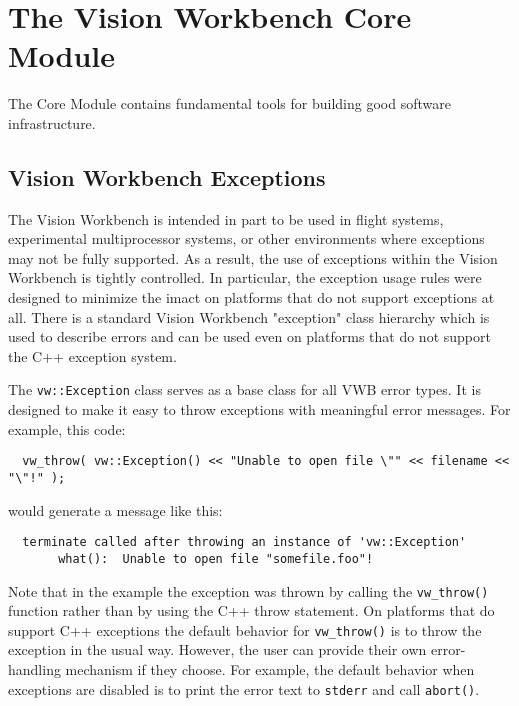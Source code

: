\chapter{The Vision Workbench Core Module}
\label{ch:core-module}

The Core Module contains fundamental tools for building good software infrastructure.

 \section{Vision Workbench Exceptions}
\label{sec:exceptions}

The Vision Workbench is intended in part to be used in flight systems,
experimental multiprocessor systems, or other environments where
exceptions may not be fully supported.  As a result, the use of
exceptions within the Vision Workbench is tightly controlled.  In
particular, the exception usage rules were designed to minimize the
imact on platforms that do not support exceptions at all.  There is a
standard Vision Workbench "exception" class hierarchy which is used to
describe errors and can be used even on platforms that do not support
the C++ exception system.
 
The \verb#vw::Exception# class serves as a base class for all VWB error
types.  It is designed to make it easy to throw exceptions with
meaningful error messages.  For example, this code:

\begin{verbatim}
  vw_throw( vw::Exception() << "Unable to open file \"" << filename << "\"!" );
\end{verbatim}

would generate a message like this:

\begin{verbatim}
  terminate called after throwing an instance of 'vw::Exception'
       what():  Unable to open file "somefile.foo"! 
\end{verbatim}

Note that in the example the exception was thrown by calling the
\verb#vw_throw()# function rather than by using the C++ throw
statement.  On platforms that do support C++ exceptions the default
behavior for \verb#vw_throw()# is to throw the exception in the usual
way.  However, the user can provide their own error-handling mechanism
if they choose.  For example, the default behavior when exceptions are
disabled is to print the error text to \verb#stderr# and call
\verb#abort()#.

